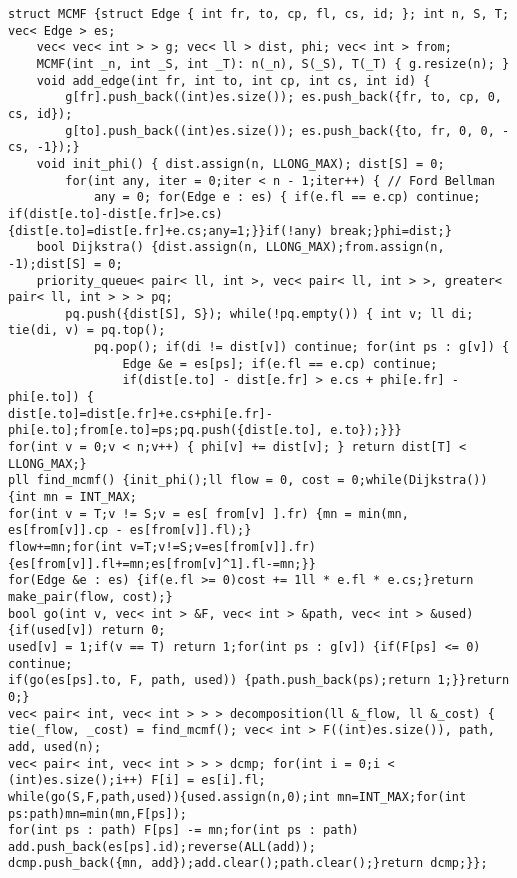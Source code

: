 \documentclass[12pt]{article}
\begin{document}
\begin{verbatim}
struct MCMF {struct Edge { int fr, to, cp, fl, cs, id; }; int n, S, T; vec< Edge > es;
    vec< vec< int > > g; vec< ll > dist, phi; vec< int > from;
    MCMF(int _n, int _S, int _T): n(_n), S(_S), T(_T) { g.resize(n); }
    void add_edge(int fr, int to, int cp, int cs, int id) {
        g[fr].push_back((int)es.size()); es.push_back({fr, to, cp, 0, cs, id});
        g[to].push_back((int)es.size()); es.push_back({to, fr, 0, 0, -cs, -1});}
    void init_phi() { dist.assign(n, LLONG_MAX); dist[S] = 0;
        for(int any, iter = 0;iter < n - 1;iter++) { // Ford Bellman
            any = 0; for(Edge e : es) { if(e.fl == e.cp) continue;
if(dist[e.to]-dist[e.fr]>e.cs){dist[e.to]=dist[e.fr]+e.cs;any=1;}}if(!any) break;}phi=dist;}
    bool Dijkstra() {dist.assign(n, LLONG_MAX);from.assign(n, -1);dist[S] = 0;
    priority_queue< pair< ll, int >, vec< pair< ll, int > >, greater< pair< ll, int > > > pq;
        pq.push({dist[S], S}); while(!pq.empty()) { int v; ll di; tie(di, v) = pq.top();
            pq.pop(); if(di != dist[v]) continue; for(int ps : g[v]) {
                Edge &e = es[ps]; if(e.fl == e.cp) continue;
                if(dist[e.to] - dist[e.fr] > e.cs + phi[e.fr] - phi[e.to]) {
dist[e.to]=dist[e.fr]+e.cs+phi[e.fr]-phi[e.to];from[e.to]=ps;pq.push({dist[e.to], e.to});}}}
for(int v = 0;v < n;v++) { phi[v] += dist[v]; } return dist[T] < LLONG_MAX;}
pll find_mcmf() {init_phi();ll flow = 0, cost = 0;while(Dijkstra()) {int mn = INT_MAX;
for(int v = T;v != S;v = es[ from[v] ].fr) {mn = min(mn, es[from[v]].cp - es[from[v]].fl);}
flow+=mn;for(int v=T;v!=S;v=es[from[v]].fr){es[from[v]].fl+=mn;es[from[v]^1].fl-=mn;}}
for(Edge &e : es) {if(e.fl >= 0)cost += 1ll * e.fl * e.cs;}return make_pair(flow, cost);}
bool go(int v, vec< int > &F, vec< int > &path, vec< int > &used) {if(used[v]) return 0;
used[v] = 1;if(v == T) return 1;for(int ps : g[v]) {if(F[ps] <= 0) continue;
if(go(es[ps].to, F, path, used)) {path.push_back(ps);return 1;}}return 0;}
vec< pair< int, vec< int > > > decomposition(ll &_flow, ll &_cost) {
tie(_flow, _cost) = find_mcmf(); vec< int > F((int)es.size()), path, add, used(n);
vec< pair< int, vec< int > > > dcmp; for(int i = 0;i < (int)es.size();i++) F[i] = es[i].fl;
while(go(S,F,path,used)){used.assign(n,0);int mn=INT_MAX;for(int ps:path)mn=min(mn,F[ps]);
for(int ps : path) F[ps] -= mn;for(int ps : path) add.push_back(es[ps].id);reverse(ALL(add));
dcmp.push_back({mn, add});add.clear();path.clear();}return dcmp;}};
\end{verbatim}
\end{document}
